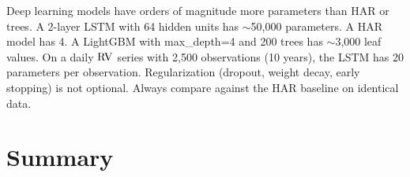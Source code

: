 \begin{warning}
Deep learning models have orders of magnitude more parameters than HAR or trees.
A 2-layer LSTM with 64 hidden units has $\sim$50,000 parameters.
A HAR model has 4.
A LightGBM with max\_depth=4 and 200 trees has $\sim$3,000 leaf values.
On a daily $\operatorname{RV}$ series with 2,500 observations (10 years), the LSTM has 20 parameters per observation.
Regularization (dropout, weight decay, early stopping) is not optional.
Always compare against the HAR baseline on identical data.
\end{warning}


\section{Summary}\label{sec:dl:summary}


